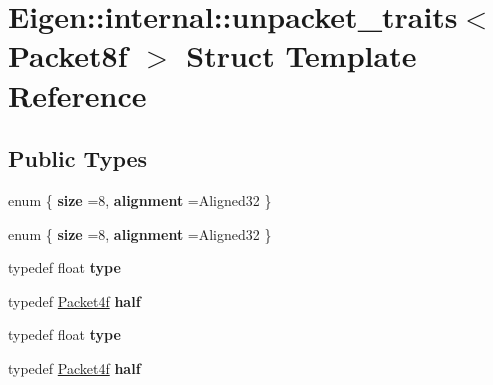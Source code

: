\hypertarget{struct_eigen_1_1internal_1_1unpacket__traits_3_01_packet8f_01_4}{}\section{Eigen\+:\+:internal\+:\+:unpacket\+\_\+traits$<$ Packet8f $>$ Struct Template Reference}
\label{struct_eigen_1_1internal_1_1unpacket__traits_3_01_packet8f_01_4}
\subsection*{Public Types}
\begin{DoxyCompactItemize}
\item 
\mbox{\label{struct_eigen_1_1internal_1_1unpacket__traits_3_01_packet8f_01_4_a00d7a07d8524aa1afdd810ea0e52a11d}} 
enum \{ {\bfseries size} =8, 
{\bfseries alignment} =Aligned32
 \}
\item 
\mbox{\label{struct_eigen_1_1internal_1_1unpacket__traits_3_01_packet8f_01_4_a49aa8fc668156fc31707800106bddb64}} 
enum \{ {\bfseries size} =8, 
{\bfseries alignment} =Aligned32
 \}
\item 
\mbox{\label{struct_eigen_1_1internal_1_1unpacket__traits_3_01_packet8f_01_4_a8a3bb88f05ceb7126a3e15104d27932a}} 
typedef float {\bfseries type}
\item 
\mbox{\label{struct_eigen_1_1internal_1_1unpacket__traits_3_01_packet8f_01_4_a244e650cd5a4262422abafbfa4221945}} 
typedef \hyperlink{struct_eigen_1_1internal_1_1_packet4f}{Packet4f} {\bfseries half}
\item 
\mbox{\label{struct_eigen_1_1internal_1_1unpacket__traits_3_01_packet8f_01_4_a8a3bb88f05ceb7126a3e15104d27932a}} 
typedef float {\bfseries type}
\item 
\mbox{\label{struct_eigen_1_1internal_1_1unpacket__traits_3_01_packet8f_01_4_a244e650cd5a4262422abafbfa4221945}} 
typedef \hyperlink{struct_eigen_1_1internal_1_1_packet4f}{Packet4f} {\bfseries half}
\end{DoxyCompactItemize}


